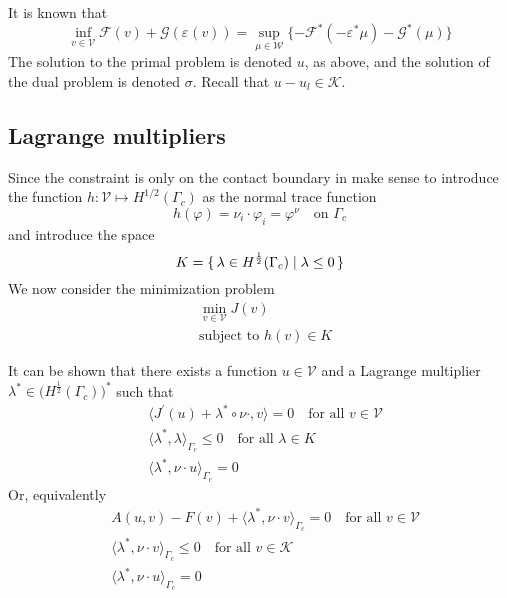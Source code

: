 \documentclass[12pt,a4paper]{article}
\numberwithin{equation}{section}
\numberwithin{table}{section}
\numberwithin{figure}{section}
\newcommand{\W}{\ensuremath{\mathcal{W}}}
\newcommand{\half}{\ensuremath{\frac{1}{2}}}
\newcommand{\V}{\ensuremath{\mathcal{V}}}
\newcommand{\K}{\ensuremath{\mathcal{K}}}
\newcommand{\F}{\ensuremath{{\mathcal F}}}
\newcommand{\G}{\ensuremath{{\mathcal G}}}
\renewcommand{\epsilon}{\varepsilon}
\renewcommand{\phi}{\varphi}
\newcommand{\strain}[1][]{\ensuremath{\epsilon_{#1}}}
\providecommand{\dualp}[2]{\langle #1, #2 \rangle}
\newcommand{\infvinV}{\ensuremath{\inf_{v\in \V}}}
\begin{document}
It is known that
\begin{equation}
  \label{eq:PrimalDualNoGap}
  \infvinV \F(v) + \G(\strain(v))
  = \sup_{\mu\in \W} \{ - \F^*(-\strain^* \mu) - \G^*(\mu) \}
\end{equation}
The solution to the primal problem is denoted $u$, as above, and the solution of the dual
problem is denoted $\sigma$.  Recall that $u-u_l\in \K$. 


\subsection{Lagrange multipliers}

Since the constraint is only on the contact boundary in make sense to introduce the function $h : \V \mapsto H^{1/2}(\Gamma_c)$ as the normal trace function
\begin{equation}
  h(\phi) = \nu_i\cdot\phi_i = \phi^\nu \quad \text{on $\Gamma_c$}
\end{equation}
and introduce the space
\begin{equation}
  K = \set{\lambda \in H^\half(\Gamma_c) | \lambda \le 0}
\end{equation}
We now consider the minimization problem 
\begin{equation}
  \begin{split}
    &\min_{v\in\V} J(v) \\
    &\text{subject to $h(v) \in K$}
  \end{split}
\end{equation}

It can be shown that there exists a function $u\in\V$ and a Lagrange multiplier
$\lambda^* \in \bigl(H^{\half}(\Gamma_c)\bigr)^*$ such that
\begin{align}
  &\dualp{J^\prime(u) + \lambda^* \circ \nu\cdot}{v} = 0 \quad\text{for all $v\in \V$} \\
  &\dualp{\lambda^*}{\lambda}_{\Gamma_c} \le 0 \quad\text{for all $\lambda\in K$} \\
  &\dualp{\lambda^*}{\nu\cdot u}_{\Gamma_c} = 0
\end{align}
Or, equivalently
\begin{align}
  & A(u,v) - F(v) + \dualp{\lambda^*}{\nu\cdot v}_{\Gamma_c} = 0
  \quad\text{for all $v\in \V$} \\
  &\dualp{\lambda^*}{\nu\cdot v}_{\Gamma_c} \le 0 \quad\text{for all $v\in \K$} \\
  &\dualp{\lambda^*}{\nu\cdot u}_{\Gamma_c} = 0
\end{align}
\end{document}

